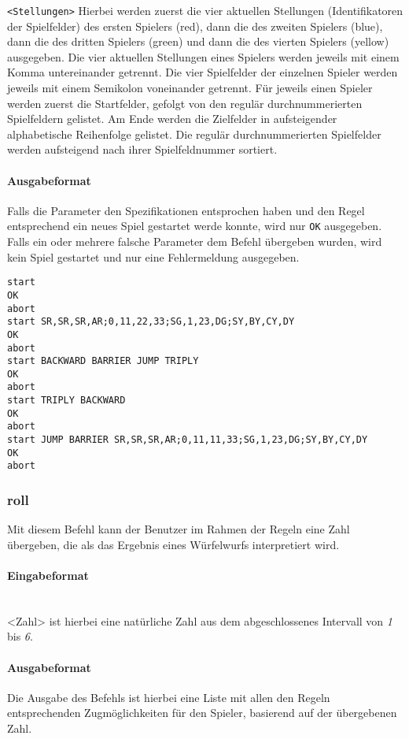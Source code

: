 \texttt{<Stellungen>} Hierbei werden zuerst die vier aktuellen Stellungen (Identifikatoren der Spielfelder) des ersten Spielers (red), dann die des zweiten Spielers (blue), dann die des dritten Spielers (green) und dann die des vierten Spielers (yellow) ausgegeben. Die vier aktuellen Stellungen eines Spielers werden jeweils mit einem Komma untereinander getrennt. Die vier Spielfelder der einzelnen Spieler werden jeweils mit einem Semikolon voneinander getrennt. Für jeweils einen Spieler werden zuerst die Startfelder, gefolgt von den regulär durchnummerierten Spielfeldern gelistet. Am Ende werden die Zielfelder in aufsteigender alphabetische Reihenfolge gelistet. Die regulär durchnummerierten Spielfelder werden aufsteigend nach ihrer Spielfeldnummer sortiert.

\paragraph*{Ausgabeformat}
Falls die Parameter den Spezifikationen entsprochen haben und den Regel entsprechend ein neues Spiel gestartet werde konnte, wird nur \texttt{OK} ausgegeben. Falls ein oder mehrere falsche Parameter dem Befehl übergeben wurden, wird kein Spiel gestartet und nur eine Fehlermeldung ausgegeben.

\begin{tcolorbox}[title=Beispiel]
\begin{verbatim}
start
OK
abort
start SR,SR,SR,AR;0,11,22,33;SG,1,23,DG;SY,BY,CY,DY
OK
abort
start BACKWARD BARRIER JUMP TRIPLY
OK
abort
start TRIPLY BACKWARD
OK
abort
start JUMP BARRIER SR,SR,SR,AR;0,11,11,33;SG,1,23,DG;SY,BY,CY,DY
OK
abort
\end{verbatim}
\end{tcolorbox}


\subsubsection*{roll}
Mit diesem Befehl kann der Benutzer im Rahmen der Regeln eine Zahl übergeben, die als das Ergebnis eines Würfelwurfs interpretiert wird.
\paragraph*{Eingabeformat}
\\
<Zahl> ist hierbei eine natürliche Zahl aus dem abgeschlossenes Intervall von \emph{1} bis \emph{6}.
\paragraph*{Ausgabeformat}
Die Ausgabe des Befehls ist hierbei eine Liste mit allen den Regeln entsprechenden Zugmöglichkeiten für den Spieler, basierend auf der übergebenen Zahl.

